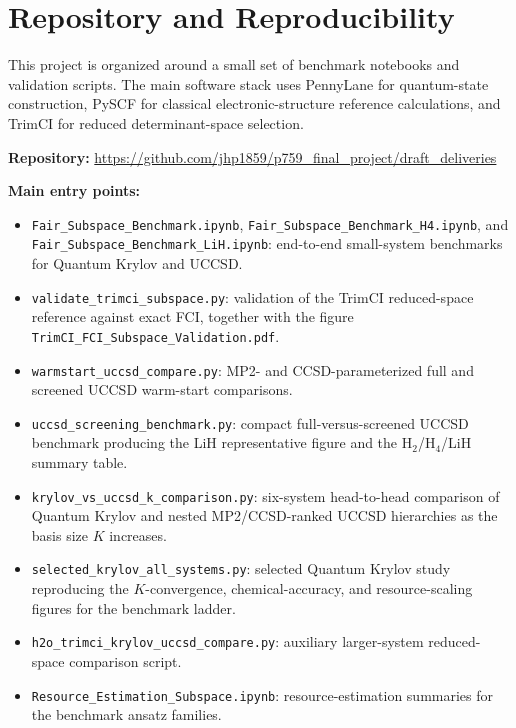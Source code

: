 \section{Repository and Reproducibility}

This project is organized around a small set of benchmark notebooks and validation scripts. The main software stack uses PennyLane for quantum-state construction, PySCF for classical electronic-structure reference calculations, and TrimCI for reduced determinant-space selection.

\textbf{Repository:} \url{https://github.com/jhp1859/p759_final_project/draft_deliveries}

\textbf{Main entry points:}
\begin{itemize}
    \item \texttt{Fair\_Subspace\_Benchmark.ipynb}, \texttt{Fair\_Subspace\_Benchmark\_H4.ipynb}, and \texttt{Fair\_Subspace\_Benchmark\_LiH.ipynb}: end-to-end small-system benchmarks for Quantum Krylov and UCCSD.
    \item \texttt{validate\_trimci\_subspace.py}: validation of the TrimCI reduced-space reference against exact FCI, together with the figure \texttt{TrimCI\_FCI\_Subspace\_Validation.pdf}.
    \item \texttt{warmstart\_uccsd\_compare.py}: MP2- and CCSD-parameterized full and screened UCCSD warm-start comparisons.
    \item \texttt{uccsd\_screening\_benchmark.py}: compact full-versus-screened UCCSD benchmark producing the LiH representative figure and the H$_2$/H$_4$/LiH summary table.
    \item \texttt{krylov\_vs\_uccsd\_k\_comparison.py}: six-system head-to-head comparison of Quantum Krylov and nested MP2/CCSD-ranked UCCSD hierarchies as the basis size $K$ increases.
    \item \texttt{selected\_krylov\_all\_systems.py}: selected Quantum Krylov study reproducing the $K$-convergence, chemical-accuracy, and resource-scaling figures for the benchmark ladder.
    \item \texttt{h2o\_trimci\_krylov\_uccsd\_compare.py}: auxiliary larger-system reduced-space comparison script.
    \item \texttt{Resource\_Estimation\_Subspace.ipynb}: resource-estimation summaries for the benchmark ansatz families.
\end{itemize}

